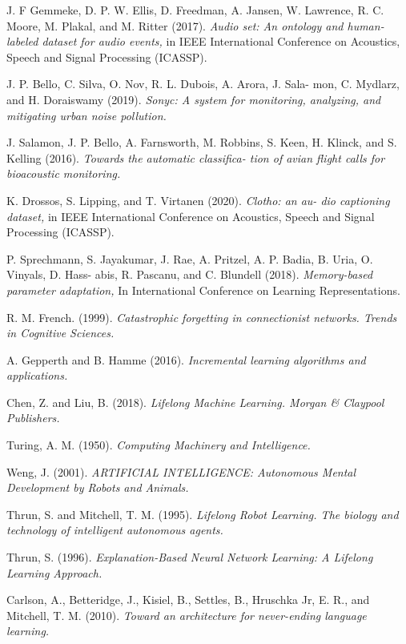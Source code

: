 \documentclass[english, LaM, oneside]{sapthesis}%
\begin{document}
\begin{thebibliography}{17}
J. F Gemmeke, D. P. W. Ellis, D. Freedman, A. Jansen, W. Lawrence, R. C. Moore, M. Plakal, and M. Ritter (2017). \textit{Audio set: An ontology and human-labeled dataset for audio events,} in IEEE International Conference on Acoustics, Speech and Signal Processing (ICASSP).
 
 J. P. Bello, C. Silva, O. Nov, R. L. Dubois, A. Arora, J. Sala- mon, C. Mydlarz, and H. Doraiswamy (2019). \textit{Sonyc: A system for monitoring, analyzing, and mitigating urban noise pollution.} 
 
 J. Salamon, J. P. Bello, A. Farnsworth, M. Robbins, S. Keen, H. Klinck, and S. Kelling (2016). \textit{Towards the automatic classifica- tion of avian flight calls for bioacoustic monitoring.} 
 
  K. Drossos, S. Lipping, and T. Virtanen (2020). \textit{Clotho: an au- dio captioning dataset,} in IEEE International Conference on Acoustics, Speech and Signal Processing (ICASSP).

 P. Sprechmann, S. Jayakumar, J. Rae, A. Pritzel, A. P. Badia, B. Uria, O. Vinyals, D. Hass- abis, R. Pascanu, and C. Blundell (2018). \textit{Memory-based parameter adaptation,} In International Conference on Learning Representations. 

 R. M. French. (1999). \textit{Catastrophic forgetting in connectionist networks. Trends in Cognitive Sciences.} 
 
 
A. Gepperth and B. Hamme (2016). \textit{Incremental learning algorithms and applications.} 
 
Chen, Z. and Liu, B. (2018). \textit{Lifelong Machine Learning. Morgan & Claypool Publishers.} 


Turing, A. M. (1950). \textit{Computing Machinery and Intelligence.} 

Weng, J. (2001). \textit{ARTIFICIAL INTELLIGENCE: Autonomous Mental Development by Robots and Animals.} 

Thrun, S. and Mitchell, T. M. (1995). \textit{Lifelong Robot Learning. The biology and technology of intelligent autonomous agents.} 

Thrun, S. (1996). \textit{Explanation-Based Neural Network Learning: A Lifelong Learning Approach.} 

Carlson, A., Betteridge, J., Kisiel, B., Settles, B., Hruschka Jr, E. R., and Mitchell, T. M. (2010). \textit{Toward an architecture for never-ending language learning.} 


\end{thebibliography}
\end{document}
